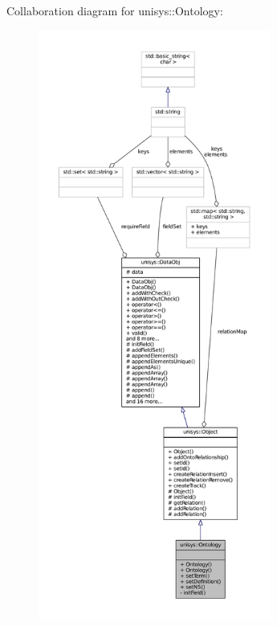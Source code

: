 Collaboration diagram for unisys\-:\-:Ontology\-:
\nopagebreak
\begin{figure}[H]
\begin{center}
\leavevmode
\includegraphics[height=550pt]{classunisys_1_1Ontology__coll__graph}
\end{center}
\end{figure}
